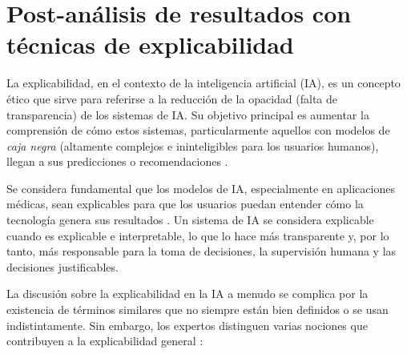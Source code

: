 
\chapter{Post-análisis de resultados con técnicas de explicabilidad} \label{chap:explicabilidad}
La explicabilidad, en el contexto de la inteligencia artificial (IA), es un concepto ético que sirve para referirse a la reducción de la opacidad (falta de transparencia) de los sistemas de IA. Su objetivo principal es aumentar la comprensión de cómo estos sistemas, particularmente aquellos con modelos de \textit{caja negra} (altamente complejos e ininteligibles para los usuarios humanos), llegan a sus predicciones o recomendaciones \parencite{ursin2023levels}.

Se considera fundamental que los modelos de IA, especialmente en aplicaciones médicas, sean explicables para que los usuarios puedan entender cómo la tecnología genera sus resultados \parencite{hildt2025role}. Un sistema de IA se considera explicable cuando es explicable e interpretable, lo que lo hace más transparente y, por lo tanto, más responsable para la toma de decisiones, la supervisión humana y las decisiones justificables.

La discusión sobre la explicabilidad en la IA a menudo se complica por la existencia de términos similares que no siempre están bien definidos o se usan indistintamente. Sin embargo, los expertos distinguen varias nociones que contribuyen a la explicabilidad general \parencite{adams2023defending}:

